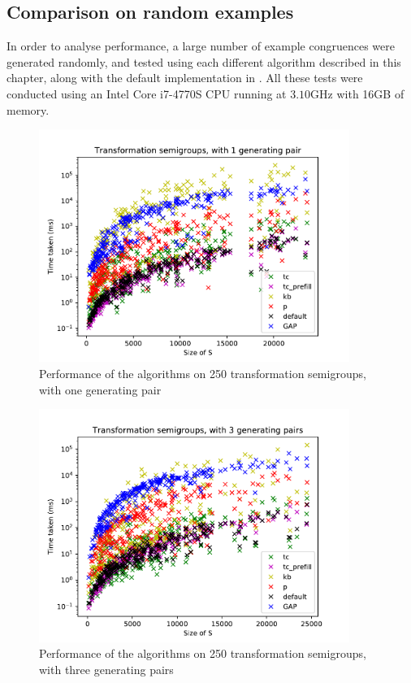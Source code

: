 \subsection{Comparison on random examples}
\label{sec:random-benchmarking}
In order to analyse performance, a large number of example congruences were
generated randomly, and tested using each different algorithm described in this
chapter, along with the default implementation in \GAP{} \cite{gap}.  All these
tests were conducted using an Intel Core i7-4770S CPU running at $3.10$GHz with
16GB of memory.

\begin{figure}[p]
  \centering
  \includegraphics[width=0.9\textwidth]{pics/ch-pairs/bench-trans-1p-times}
  \caption[Benchmark: all algorithms, concrete, 1 pair]
  {Performance of the algorithms on 250 transformation semigroups, with
    one generating pair}
  \label{fig:bench-trans-1p-times}
\end{figure}

\begin{figure}[p]
  \centering
  \includegraphics[width=0.9\textwidth]{pics/ch-pairs/bench-trans-3p-times}
  \caption[Benchmark: all algorithms, concrete, 3 pairs]
  {Performance of the algorithms on 250 transformation semigroups, with
    three generating pairs}
  \label{fig:bench-trans-3p-times}
\end{figure}

